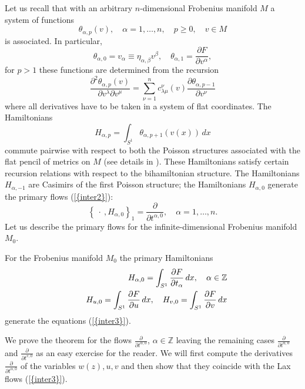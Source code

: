 \documentclass[numbook, envcountsame, envcountreset]{svjour3}
\begin{document}
Let us recall \cite{icm} that with an arbitrary $n$-dimensional Frobenius manifold $M$ a system of functions
$$
\theta_{\alpha,p}(v), \quad \alpha=1, \dots, n, \quad p\geq 0, \quad v\in M
$$
is associated. In particular,
$$
\theta_{\alpha,0}=v_\alpha\equiv \eta_{\alpha, \beta} v^\beta, \quad \theta_{\alpha,1}=\frac{{\partial} F}{{\partial} v^\alpha},
$$
for $p>1$ these functions are determined from the recursion
\begin{equation}\label{recur}
\frac{{\partial}^2 \theta_{\alpha,p}(v)}{{\partial} v^\lambda {\partial} v^\mu} = \sum_{\nu=1}^n c_{\lambda\mu}^\nu(v) \frac{{\partial} \theta_{\alpha,p-1}}{{\partial} v^\nu}
\end{equation}
where all derivatives have to be taken in a system of flat coordinates.
The Hamiltonians
$$
H_{\alpha,p} =\int_{S^1} \theta_{\alpha,p+1}(v(x))\, dx
$$
commute pairwise with respect to both the Poisson structures associated with the flat pencil of metrics on $M$ (see details in \cite{icm}). These Hamiltonians satisfy certain recursion relations with respect to the bihamiltonian structure. The Hamiltonians $H_{\alpha,-1}$ are Casimirs of the first Poisson structure; the Hamiltonians $H_{\alpha,0}$ generate the primary flows {(\ref{{inter2}})}: 
$$
\left\{ ~ \cdot ~, H_{\alpha,0}\right\}_1 =\frac{\partial}{{\partial} t^{\alpha,0}}, \quad \alpha=1, \dots, n.
$$
Let us describe the primary flows for the infinite-dimensional Frobenius manifold $M_0$.

\begin{lemma}
For the Frobenius manifold $M_0$ the primary Hamiltonians
\begin{eqnarray}
&&
H_{\alpha,0}=\int_{S^1} \frac{{\partial} F}{{\partial} t_\alpha}\, dx, \quad \alpha\in \mathbb Z
{\nonumber}\\
&&
H_{u,0}= \int_{S^1} \frac{{\partial} F}{{\partial} u}\, dx, \quad H_{v,0}= \int_{S^1} \frac{{\partial} F}{{\partial} v}\, dx
{\nonumber}
\end{eqnarray}
generate the equations {(\ref{{inter3}})}.
\end{lemma}

{} We prove the theorem for the flows $\frac{\partial}{{\partial} t^{\alpha,0}}$, $\alpha\in\mathbb Z$ leaving the remaining cases $\frac{\partial}{{\partial} t^{u,0}}$ and $\frac{\partial}{{\partial} t^{v,0}}$ as an easy exercise  for the reader. We will first compute the derivatives $\frac{\partial}{{\partial} t^{\alpha,0}}$ of the variables $w(z),u,v$ and then show that they coincide with the Lax flows {(\ref{{inter3}})}. 
\end{document}
